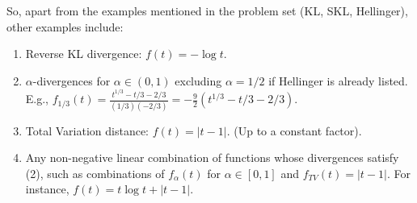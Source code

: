 \documentclass{article}
\begin{document}
So, apart from the examples mentioned in the problem set (KL, SKL, Hellinger), other examples include:
\begin{enumerate}
    \item Reverse KL divergence: $f(t) = -\log t$.
    \item $\alpha$-divergences for $\alpha \in (0, 1)$ excluding $\alpha=1/2$ if Hellinger is already listed. E.g., $f_{1/3}(t) = \frac{t^{1/3} - t/3 - 2/3}{(1/3)(-2/3)} = -\frac{9}{2}(t^{1/3} - t/3 - 2/3)$.
    \item Total Variation distance: $f(t) = |t-1|$. (Up to a constant factor).
    \item Any non-negative linear combination of functions whose divergences satisfy (2), such as combinations of $f_\alpha(t)$ for $\alpha \in [0, 1]$ and $f_{TV}(t)=|t-1|$. For instance, $f(t) = t \log t + |t-1|$.
\end{enumerate}
\end{document}
